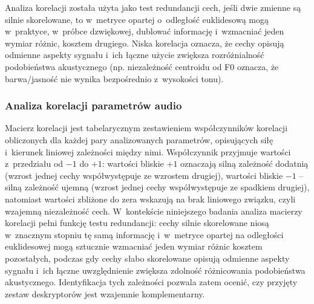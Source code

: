 \documentclass{article}
\begin{document}
Analiza korelacji została użyta jako test redundancji cech, jeśli dwie zmienne są silnie skorelowane, to w~metryce opartej o~odległość euklidesową mogą w~praktyce, w~próbce dzwiękowej,  dublować informację i~wzmacniać jeden wymiar różnic, kosztem drugiego. Niska korelacja oznacza, że cechy opisują odmienne aspekty sygnału i~ich łączne użycie zwiększa rozróżnialność podobieństwa akustycznego (np. niezależność centroidu od F0 oznacza, że barwa/jasność nie wynika bezpośrednio z~wysokości tonu).

\subsubsection{Analiza korelacji parametrów audio}
Macierz korelacji jest tabelarycznym zestawieniem współczynników korelacji obliczonych dla każdej pary analizowanych parametrów, opisujących siłę i~kierunek liniowej zależności między nimi. Współczynnik przyjmuje wartości z~przedziału od $-1$ do $+1$: wartości bliskie $+1$ oznaczają silną zależność dodatnią (wzrost jednej cechy współwystępuje ze wzrostem drugiej), wartości bliskie $-1$ -- silną zależność ujemną (wzrost jednej cechy współwystępuje ze spadkiem drugiej), natomiast wartości zbliżone do zera wskazują na brak liniowego związku, czyli wzajemną niezależność cech. W~kontekście niniejszego badania analiza macierzy korelacji pełni funkcję testu redundancji: cechy silnie skorelowane niosą w~znacznym stopniu tę samą informację i~w~metryce opartej na odległości euklidesowej mogą sztucznie wzmacniać jeden wymiar różnic kosztem pozostałych, podczas gdy cechy słabo skorelowane opisują odmienne aspekty sygnału i~ich łączne uwzględnienie zwiększa zdolność różnicowania podobieństwa akustycznego. Identyfikacja tych zależności pozwala zatem ocenić, czy przyjęty zestaw deskryptorów jest wzajemnie komplementarny.
\end{document}
